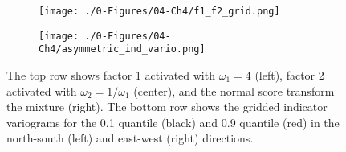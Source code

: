 \begin{figure}[!htb]
    \begin{subfigure}{1.0\textwidth}
        \centering
        \texttt{[image: ./0-Figures/04-Ch4/f1\_f2\_grid.png]}
    \end{subfigure}
    \begin{subfigure}{1.0\textwidth}
        \centering
        \texttt{[image: ./0-Figures/04-Ch4/asymmetric\_ind\_vario.png]}
    \end{subfigure}
    \caption{The top row shows factor 1 activated with $\omega_{1}=4$ (left), factor 2 activated with $\omega_{2}=1/\omega_{1}$ (center), and the normal score transform the mixture (right). The bottom row shows the gridded indicator variograms for the 0.1 quantile (black) and 0.9 quantile (red) in the north-south (left) and east-west (right) directions. }
    \label{fig:pool_asymmetry}
\end{figure}

